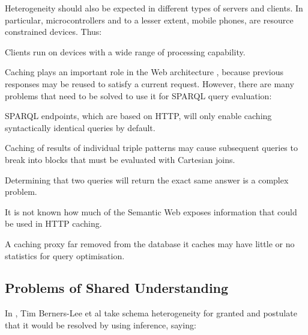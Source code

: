 Heterogeneity should also be expected in different types of servers
and clients. In particular, microcontrollers and to a lesser extent,
mobile phones, are resource constrained devices. Thus:

\begin{problem}\label{prob:microcontroller}
Clients run on devices with a wide range of processing capability.
\end{problem}



Caching plays an important role in the Web architecture
\cite{Jacobs:04:AWW}, because previous responses may be reused to
satisfy a current request. However, there are many problems that need
to be solved to use it for SPARQL query evaluation:

\begin{problem}\label{prob:syntacticcache}
SPARQL endpoints, which are based on HTTP, will only enable caching
syntactically identical queries by  default.
\end{problem}

\begin{problem}\label{prob:cachecartesian}
Caching of results of individual triple patterns may cause subsequent
queries to break into blocks that must be evaluated with Cartesian joins.
\end{problem}

\begin{problem}\label{prob:queryeq}
Determining that two queries will return the exact same answer is a
complex problem.
\end{problem}

\begin{problem}\label{prob:sanity}
It is not known how much of the Semantic Web exposes information that
could be used in HTTP caching.
\end{problem}

\begin{problem}\label{prob:nostats}
A caching proxy far removed from the database it caches may have
little or no statistics for query optimisation.
\end{problem}



\subsection{Problems of Shared Understanding}\label{sec:semproblems}

In \cite{berners2000weaving}, Tim Berners-Lee et al take schema
heterogeneity for granted and postulate that it would be resolved by using
inference, saying:

